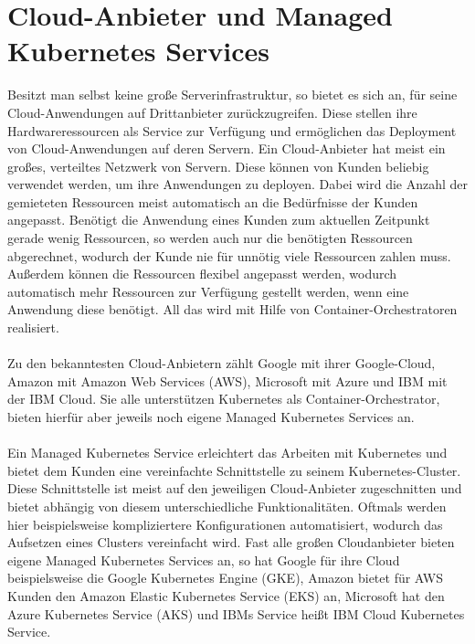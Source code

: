 \section{Cloud-Anbieter und Managed Kubernetes Services}
Besitzt man selbst keine große Serverinfrastruktur, so bietet es sich an, für seine Cloud-Anwendungen auf Drittanbieter zurückzugreifen. Diese stellen ihre Hardwareressourcen als Service zur Verfügung und ermöglichen das Deployment von Cloud-Anwendungen auf deren Servern. Ein Cloud-Anbieter hat meist ein großes, verteiltes Netzwerk von Servern. Diese können von Kunden beliebig verwendet werden, um ihre Anwendungen zu deployen. Dabei wird die Anzahl der gemieteten Ressourcen meist automatisch an die Bedürfnisse der Kunden angepasst. Benötigt die Anwendung eines Kunden zum aktuellen Zeitpunkt gerade wenig Ressourcen, so werden auch nur die benötigten Ressourcen abgerechnet, wodurch der Kunde nie für unnötig viele Ressourcen zahlen muss. Außerdem können die Ressourcen flexibel angepasst werden, wodurch automatisch mehr Ressourcen zur Verfügung gestellt werden, wenn eine Anwendung diese benötigt. All das wird mit Hilfe von Container-Orchestratoren realisiert.
\\\\
Zu den bekanntesten Cloud-Anbietern zählt Google mit ihrer Google-Cloud, Amazon mit Amazon Web Services (AWS), Microsoft mit Azure und IBM mit der IBM Cloud. Sie alle unterstützen Kubernetes als Container-Orchestrator, bieten hierfür aber jeweils noch eigene Managed Kubernetes Services an.
\\\\
Ein Managed Kubernetes Service erleichtert das Arbeiten mit Kubernetes und bietet dem Kunden eine vereinfachte Schnittstelle zu seinem Kubernetes-Cluster. Diese Schnittstelle ist meist auf den jeweiligen Cloud-Anbieter zugeschnitten und bietet abhängig von diesem unterschiedliche Funktionalitäten. Oftmals werden hier beispielsweise kompliziertere Konfigurationen automatisiert, wodurch das Aufsetzen eines Clusters vereinfacht wird. Fast alle großen Cloudanbieter bieten eigene Managed Kubernetes Services an, so hat Google für ihre Cloud beispielsweise die Google Kubernetes Engine (GKE), Amazon bietet für AWS Kunden den Amazon Elastic Kubernetes Service (EKS) an, Microsoft hat den Azure Kubernetes Service (AKS) und IBMs Service heißt IBM Cloud Kubernetes Service.
